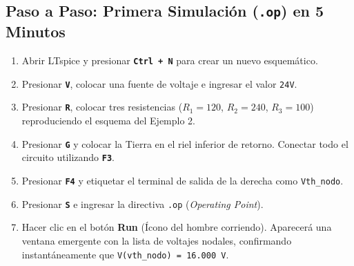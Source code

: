 \documentclass[11pt,a4paper]{article}
\newcommand{\tecla}[1]{\colorbox{gray!20}{\texttt{\footnotesize\textbf{#1}}}}
\newcommand{\menu}[1]{\textbf{\textsf{#1}}}
\begin{document}
\subsection*{Paso a Paso: Primera Simulación (\texttt{.op}) en 5 Minutos}
\begin{enumerate}
    \item Abrir LTspice y presionar \tecla{Ctrl + N} para crear un nuevo esquemático.
    \item Presionar \tecla{V}, colocar una fuente de voltaje e ingresar el valor \texttt{24V}.
    \item Presionar \tecla{R}, colocar tres resistencias ($R_1 = 120$, $R_2 = 240$, $R_3 = 100$) reproduciendo el esquema del Ejemplo 2.
    \item Presionar \tecla{G} y colocar la Tierra en el riel inferior de retorno. Conectar todo el circuito utilizando \tecla{F3}.
    \item Presionar \tecla{F4} y etiquetar el terminal de salida de la derecha como \texttt{Vth\_nodo}.
    \item Presionar \tecla{S} e ingresar la directiva \texttt{.op} (\textit{Operating Point}).
    \item Hacer clic en el botón \menu{Run} (Ícono del hombre corriendo). Aparecerá una ventana emergente con la lista de voltajes nodales, confirmando instantáneamente que \texttt{V(vth\_nodo) = 16.000 V}.
\end{enumerate}
\end{document}
